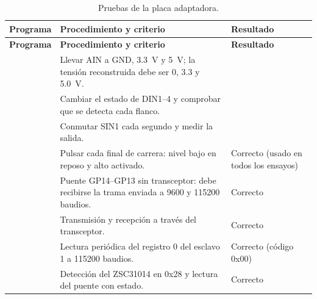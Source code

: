 \begin{longtable}{@{}L{0.35\textwidth}L{0.34\textwidth}L{0.19\textwidth}@{}}
\caption{Pruebas de la placa adaptadora.}\label{tab:pruebas-hw}\\
\toprule
\textbf{Programa} & \textbf{Procedimiento y criterio} & \textbf{Resultado} \\
\midrule
\endfirsthead
\toprule
\textbf{Programa} & \textbf{Procedimiento y criterio} & \textbf{Resultado} \\
\midrule
\endhead
{} & Llevar AIN a GND, \SI{3.3}{\volt} y \SI{5}{\volt}; la tensión reconstruida debe ser \num{0}, \num{3.3} y \SI{5.0}{\volt}. &  \\
 & Cambiar el estado de DIN1--4 y comprobar que se detecta cada flanco. & \completar{} \\
 & Conmutar SIN1 cada segundo y medir la salida. & \completar{} \\
 & Pulsar cada final de carrera: nivel bajo en reposo y alto activado. & Correcto (usado en todos los ensayos) \\
 & Puente GP14--GP13 sin transceptor: debe recibirse la trama enviada a 9600 y 115200 baudios. & Correcto \\
 & Transmisión y recepción a través del transceptor. & Correcto \\
 & Lectura periódica del registro 0 del esclavo 1 a 115200 baudios. & Correcto (código 0x00) \\
 & Detección del ZSC31014 en 0x28 y lectura del puente con estado. & Correcto \\
\bottomrule
\end{longtable}
